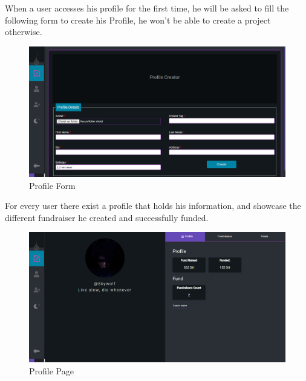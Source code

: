 When a user accesses his profile for the first time, he will be asked to fill the following form 
to create his Profile, he won't be able to create a project otherwise.

\begin{figure}[H]
      \centering
      \includegraphics[scale=0.45]{assets/screen-profile-creator.png}
      \caption{Profile Form}
      \label{fig:profile form}
\end{figure}

For every user there exist a profile that holds his information, and showcase the different fundraiser 
he created and successfully funded.
\begin{figure}[H]
      \centering
      \includegraphics[scale=0.45]{assets/screen-profile-da.png}
      \caption{Profile Page}
      \label{fig:profile view}
\end{figure}

